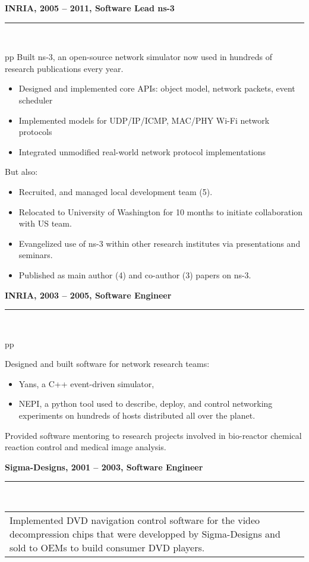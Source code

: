 \documentclass[a4paper,12pt]{article}
\newcommand{\ligne}[1]{\rule[0.5ex]{\textwidth}{#1}\\}
\newcommand{\styleRub}[1]{\textbf{\large #1}\par}
\newcommand{\indentStd}{\noindent\hspace*{10pt}}
\newenvironment{rubrique}[2][\linewidth]%
{\styleRub{#2}%
\ligne{0.5mm}
\setlength{\lenB}{#1}%
\setlength{\lenC}{\linewidth}%
\addtolength{\lenC}{-\lenA}%
\addtolength{\lenC}{-\lenB}%
\addtolength{\lenC}{-19pt}
\indentStd\begin{tabular}[t]{p{\lenB}p{\lenC}}}
{\end{tabular}}
\newlength{\lenA} %
\newlength{\lenB} %
\newlength{\lenC} %
\begin{document}
\begin{rubrique}{INRIA, 2005 -- 2011, Software Lead ns-3}
  Built ns-3, an open-source network simulator now used in hundreds of research publications every year. 
 
  \begin{itemize}
  \item Designed and implemented core APIs: object model, network packets, event scheduler
  \item Implemented models for UDP/IP/ICMP, MAC/PHY Wi-Fi network protocols
  \item Integrated unmodified real-world network protocol implementations
  \end{itemize}

  But also:
  \begin{itemize}
  \item Recruited, and managed local development team (5).
  \item Relocated to University of Washington for 10 months to initiate collaboration with US team.
  \item Evangelized use of ns-3 within other research institutes via
    presentations and seminars.
  \item Published as main author (4) and co-author (3) papers on ns-3.
  \end{itemize}

\end{rubrique}

\vspace{0.5cm}
\begin{rubrique}{INRIA, 2003 -- 2005, Software Engineer}

  Designed and built software for network research teams:  
  \begin{itemize}
  \item Yans, a C++ event-driven simulator,
  \item NEPI, a python tool used to describe, deploy, and control networking
    experiments on hundreds of hosts distributed all over the planet.
  \end{itemize}

  Provided software mentoring to research projects involved in 
  bio-reactor chemical reaction control and medical image analysis.

\end{rubrique}

\vspace{0.5cm}
\begin{rubrique}{Sigma-Designs, 2001 -- 2003, Software Engineer}

  Implemented DVD navigation control software for the video
  decompression chips that were developped by Sigma-Designs and
  sold to OEMs to build consumer DVD players.

\end{rubrique}
\end{document}
